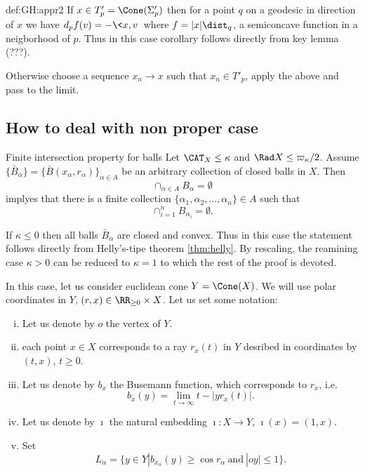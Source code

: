 {\begin{subthm}{def:GH:appr2}
If $x\in T'_p=\Cone(\Sigma'_p)$ then for a point $q$ on a geodesic in direction of $x$ we have $d_pf(v)=-\<x,v\>$ where $f=|x|\dist_q$, a semiconcave function in a neigborhood of $p$.
Thus in this case corollary follows directly from key lemma (???).

Otherwise choose a sequence $x_n\to x$ such that $x_n\in T'_p$, apply the above and pass to the limit.
\qeds










\subsection{How to deal with non proper case}

\begin{thm} {Finite intersection property for balls}\label{finite intersection of balls}
Let $\CAT_X\le \kappa$ and $\Rad X\le\varpi_\kappa/2$.
Assume $\{\bar B_\alpha\}=\{\bar B(x_\alpha,r_\alpha)\}_{\alpha\in A}$ be an arbitrary collection of closed balls in $X$.
Then 
$$\cap_{\alpha\in A}B_\alpha=\emptyset$$
implyes that there is a finite collection 
$\{\alpha_1,\alpha_2,\dots,\alpha_n\}\in A$ 
such that
$$\cap_{i=1}^nB_{\alpha_i}=\emptyset.$$
\end{thm}

If $\kappa\le 0$ then all balls $\bar B_\alpha$ are closed and convex.
Thus in this case the statement follows directly from Helly's-tipe theorem \ref{thm:helly}.
By rescaling, the reamining case $\kappa>0$ 
can be reduced to $\kappa=1$ to which the rest 
of the proof is devoted.

In this case, let us consider euclidean cone $Y=\Cone(X)$. 
We will use polar coordinates in $Y$,
$(r,x)\in\RR_{\ge0}\times X$. Let us set some notation:
\begin{enumerate}[(i)]
\item Let us denote by $o$ the vertex of $Y$.
\item each point $x\in X$ corresponds to a ray
$r_x(t)$ in $Y$ desribed in coordinates by $(t,x)$, $t\ge 0$.
\item Let us denote by $b_x$ the Busemann function, which corresponds to $r_x$, i.e.
$$b_x(y)=\lim_{t\to\infty}t-|yr_x(t)|.$$
\item Let us denote by $\imath$ the natural embedding $\imath:X\to Y$, 
$\imath(x)=(1,x)$.
\item Set
$$L_\alpha=\{y\in Y|b_{x_\alpha}(y)\ge \cos r_\alpha\ \text{and}\  |oy|\le 1\}.$$
\end{enumerate} 


\end{subthm}}
